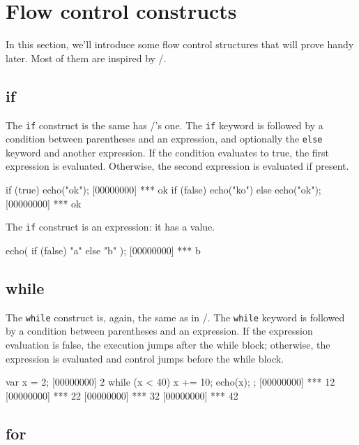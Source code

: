 \chapter{Flow control constructs}
\label{sec:tut:flow}

In this section, we'll introduce some flow control structures that
will prove handy later. Most of them are inspired by \C/\Cxx.

\section{if}

The \lstinline{if} construct is the same has \C/\Cxx's one. The
\lstinline{if} keyword is followed by a condition between parentheses and
an expression, and optionally the \lstinline{else} keyword and another
expression. If the condition evaluates to true, the first expression
is evaluated. Otherwise, the second expression is evaluated if
present.

\begin{urbiscript}
if (true)
  echo("ok");
[00000000] *** ok
if (false)
  echo("ko")
else
  echo("ok");
[00000000] *** ok
\end{urbiscript}

The \lstinline|if| construct is an expression: it has a value.

\begin{urbiscript}[firstnumber=last]
echo({ if (false) "a" else "b" });
[00000000] *** b
\end{urbiscript}

\section{while}

The \lstinline{while} construct is, again, the same as in \C/\Cxx. The
\lstinline{while} keyword is followed by a condition between parentheses
and an expression. If the expression evaluation is false, the
execution jumps after the while block; otherwise, the expression is
evaluated and control jumps before the while block.

\begin{urbiscript}[firstnumber=last]
var x = 2;
[00000000] 2
while (x < 40)
{
  x += 10;
  echo(x);
};
[00000000] *** 12
[00000000] *** 22
[00000000] *** 32
[00000000] *** 42
\end{urbiscript}

\section{for}

